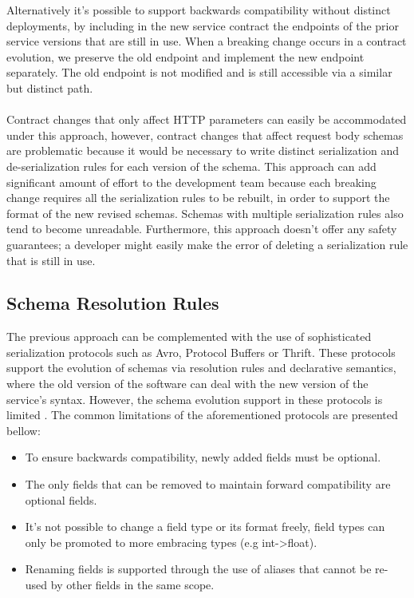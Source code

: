 Alternatively it's possible to support backwards compatibility without distinct deployments,
by including in the new service contract the endpoints of the prior service versions that are still in use.
When a breaking change occurs in a contract evolution, we preserve the old endpoint and implement the new endpoint separately.
The old endpoint is not modified and is still accessible via a similar but distinct path.

\paragraph{}

Contract changes that only affect HTTP parameters can easily be accommodated under this approach, however, contract changes that affect
request body schemas are problematic because it would be necessary to write distinct serialization and de-serialization rules for each version of the schema.
This approach can add significant amount of effort to the development team because each breaking change requires all the serialization rules to be rebuilt,
in order to support the format of the new revised schemas.
Schemas with multiple serialization rules also tend to become unreadable.
Furthermore, this approach doesn't offer any safety guarantees;
a developer might easily make the error of deleting a serialization rule that is still in use.

\subsection{Schema Resolution Rules} %
\label{sec:schema_resolution_rules}

The previous approach can be complemented with the use of sophisticated serialization protocols such as Avro, Protocol Buffers or Thrift.
These protocols support the evolution of schemas via resolution rules and declarative semantics,
where the old version of the software can deal with the new version of the service’s syntax.
However, the schema evolution support in these protocols is limited \cite{11}.
The common limitations of the aforementioned protocols are presented bellow:

\begin{itemize}
    \item To ensure backwards compatibility, newly added fields must be optional.
    \item The only fields that can be removed to maintain forward compatibility are optional fields.
    \item It's not possible to change a field type or its format freely, field types can only be promoted to more embracing types (e.g int->float).
    \item Renaming fields is supported through the use of aliases that cannot be re-used by other fields in the same scope.
\end{itemize}

